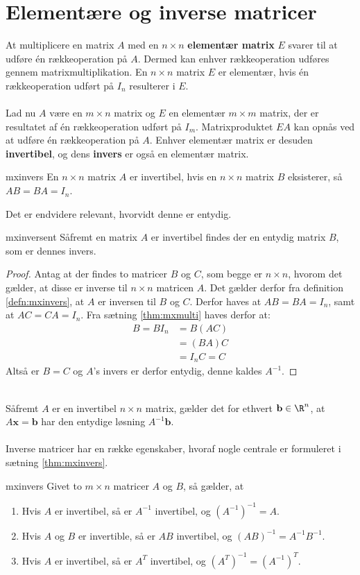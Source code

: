 \section{Elementære og inverse matricer}
At multiplicere en matrix $A$ med en $n \times n$ \textbf{elementær matrix} $E$ svarer til at udføre én rækkeoperation på $A$. 
Dermed kan enhver rækkeoperation udføres gennem matrixmultiplikation. 
En $n \times n$ matrix $E$ er elementær, hvis én rækkeoperation udført på $I_n$ resulterer i $E$. 
\\\\
Lad nu $A$ være en $m \times n$ matrix og $E$ en elementær $m \times m$ matrix, der er resultatet af én rækkeoperation udført på $I_m$. 
Matrixproduktet $EA$ kan opnås ved at udføre én rækkeoperation på $A$. 
Enhver elementær matrix er desuden \textbf{invertibel}, og dens \textbf{invers} er også en elementær matrix. 
%
\begin{defn}{}{mxinvers}
En $n \times n$ matrix $A$ er invertibel, hvis en $n \times n$ matrix $B$ eksisterer, så $AB=BA=I_n$. 
\end{defn}
\noindent
%
Det er endvidere relevant, hvorvidt denne er entydig.
\begin{thm}{}{mxinversent}
Såfremt en matrix $A$ er invertibel findes der en entydig matrix $B$, som er dennes invers.
\end{thm}
%
\begin{proof}
Antag at der findes to matricer  $B$ og $C$, som begge er $n \times n$, hvorom det gælder, at disse er inverse til $n \times n$ matricen $A$.
Det gælder derfor fra definition \ref{defn:mxinvers}, at $A$ er inversen til $B$ og $C$.
Derfor haves at $AB=BA=I_{n}$, samt at $AC=CA=I_{n}$. 
Fra sætning \ref{thm:mxmulti} haves derfor at:
\begin{align*}
B=BI_n&=B(AC) \\
&=(BA)C \\
&=I_nC=C
\end{align*} 
Altså er $B=C$ og $A$'s invers er derfor entydig, denne kaldes $A^{-1}$.
\end{proof} \\
%
Såfremt $A$ er en invertibel $n \times n$ matrix, gælder det for ethvert $\mathbf{b} \in \R^n$, at $A\textbf{x}=\mathbf{b}$ har den entydige løsning $A^{-1}\mathbf{b}$. \\\\
%
Inverse matricer har en række egenskaber, hvoraf nogle centrale er formuleret i sætning \ref{thm:mxinvers}. 
%
\begin{thm}{}{mxinvers}
Givet to $m \times n$ matricer $A$ og $B$, så gælder, at
\begin{enumerate}[label=(\alph*)]
\item Hvis $A$ er invertibel, så er $A^{-1}$ invertibel, og $(A^{-1})^{-1}=A$.
\item Hvis $A$ og $B$ er invertible, så er $AB$ invertibel, og $(AB)^{-1}=A^{-1}B^{-1}$.
\item Hvis $A$ er invertibel, så er $A^T$ invertibel, og $(A^T)^{-1}=(A^{-1})^T$.
\end{enumerate}
\end{thm}
